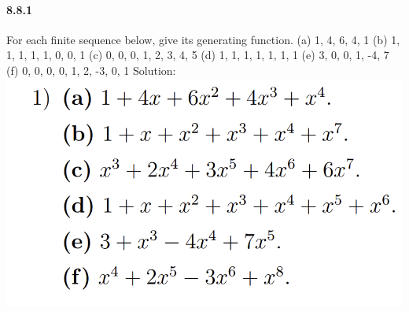 \documentclass{article}
\begin{document}
\paragraph{8.8.1}
For each finite sequence below, give its generating function.\newline
(a) 1, 4, 6, 4, 1\newline
(b) 1, 1, 1, 1, 1, 0, 0, 1\newline
(c) 0, 0, 0, 1, 2, 3, 4, 5\newline
(d) 1, 1, 1, 1, 1, 1, 1\newline
(e) 3, 0, 0, 1, -4, 7\newline
(f) 0, 0, 0, 0, 1, 2, -3, 0, 1\newline
Solution:\newline
\includegraphics{0013}
\end{document}
